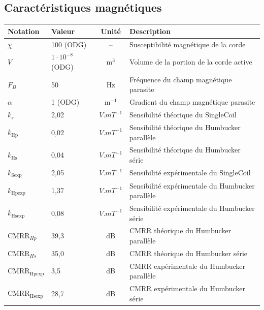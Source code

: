 \documentclass[a4paper,11pt]{article}
\begin{document}
\subsection{Caractéristiques magnétiques}
\begin{center}
\small
\begin{tabularx}{\textwidth}{llcX}
\toprule
\textbf{Notation} & \textbf{Valeur} & \textbf{Unité} & \textbf{Description} \\
\midrule
$\chi$ & 100 (ODG) & -- & Susceptibilité magnétique de la corde \\
$V$ & $1 \cdot 10^{-8}$ (ODG) & m$^{3}$ & Volume de la portion de la corde active \\
\midrule
$F_{B}$ & 50 & Hz & Fréquence du champ magnétique parasite \\
$\alpha$ & 1 (ODG) & m$^{-1}$ & Gradient du champ magnétique parasite \\
\midrule
$k_{s}$ & 2,02 & $V.mT^{-1}$ & Sensibilité théorique du SingleCoil \\
$k_{\text{Hp}}$ & 0,02 & $V.mT^{-1}$ & Sensibilité théorique du Humbucker parallèle \\
$k_{\text{Hs}}$ & 0,04 & $V.mT^{-1}$ & Sensibilité théorique du Humbucker série \\
$k_{\text{Sexp}}$ & 2,05 & $V.mT^{-1}$ & Sensibilité expérimentale du SingleCoil \\
$k_{\text{Hpexp}}$ & 1,37 & $V.mT^{-1}$ & Sensibilité expérimentale du Humbucker parallèle \\
$k_{\text{Hsexp}}$ & 0,08 & $V.mT^{-1}$ & Sensibilité expérimentale du Humbucker série \\
\midrule
$\text{CMRR}_{Hp}$ & 39,3 & dB & CMRR théorique du Humbucker parallèle \\
$\text{CMRR}_{Hs}$ & 35,0 & dB & CMRR théorique du Humbucker série \\
$\text{CMRR}_{\text{Hpexp}}$ & 3,5 & dB & CMRR expérimentale du Humbucker parallèle \\
$\text{CMRR}_{\text{Hsexp}}$ & 28,7 & dB & CMRR expérimentale du Humbucker série \\
\bottomrule
\end{tabularx}
\end{center}

\newpage
\end{document}
